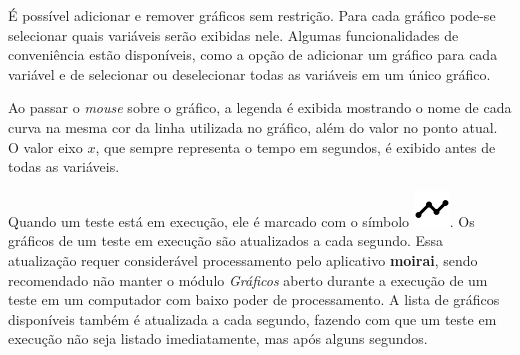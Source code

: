 É possível adicionar e remover gráficos sem restrição. Para cada gráfico pode-se
selecionar quais variáveis serão exibidas nele. Algumas funcionalidades de
conveniência estão disponíveis, como a opção de adicionar um gráfico para cada
variável e de selecionar ou deselecionar todas as variáveis em um único gráfico.

Ao passar o \textit{mouse} sobre o gráfico, a legenda é exibida mostrando o nome
de cada curva na mesma cor da linha utilizada no gráfico, além do valor no ponto
atual. O valor eixo \(x\), que sempre representa o tempo em segundos, é exibido
antes de todas as variáveis.

Quando um teste está em execução, ele é marcado com o símbolo
\includegraphics[height=\fontcharht\font`\B]{imgs/running}. Os gráficos de um
teste em execução são atualizados a cada segundo. Essa atualização requer
considerável processamento pelo aplicativo \textbf{moirai}, sendo recomendado
não manter o módulo \textit{Gráficos} aberto durante a execução de um teste em
um computador com baixo poder de processamento. A lista de gráficos disponíveis
também é atualizada a cada segundo, fazendo com que um teste em execução não
seja listado imediatamente, mas após alguns segundos.
